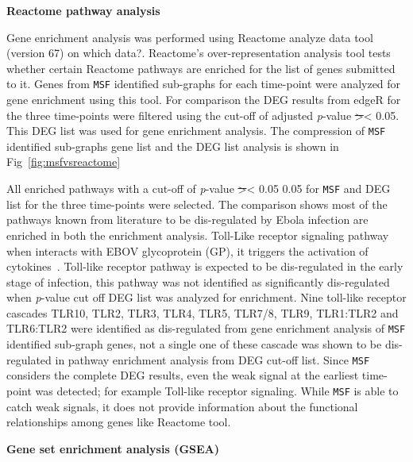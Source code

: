 \documentclass[10pt,a4paper,twocolumn]{article}
\newcommand{\FA}[1]{\begingroup\color{magenta}#1\endgroup}
\newcommand{\TODO}[1]{\begingroup\color{red}#1\endgroup}
\begin{document}
	\textbf{Reactome pathway analysis}
	
	Gene enrichment analysis was performed using Reactome analyze
        data tool~\cite{Reactome} (version 67) \TODO{on which
          data?}. Reactome's over-representation analysis tool tests
        whether certain Reactome pathways are enriched for the list of
        genes submitted to it. Genes from \texttt{MSF} identified
        sub-graphs for each time-point were analyzed for gene
        enrichment using this tool.  For comparison the DEG results
        from edgeR for the three time-points were filtered using the
        cut-off of adjusted \textit{p}-value \sout{>}\FA{<} 0.05. This
        DEG list was used for gene enrichment analysis. The
        compression of \texttt{MSF} identified sub-graphs gene list
        and the DEG list analysis is shown in
        Fig~\ref{fig:msfvsreactome}
	
	All enriched pathways with a cut-off of \textit{p}-value
        \sout{>}\FA{<} 0.05 0.05 for \texttt{MSF} and DEG list for the
        three time-points were selected. The comparison shows most of
        the pathways known from literature to be dis-regulated by
        Ebola infection are enriched in both the enrichment
        analysis. Toll-Like receptor signaling pathway when interacts
        with EBOV glycoprotein (GP), it triggers the activation of
        cytokines~\cite{Olejnik}. Toll-like receptor pathway is
        expected to be dis-regulated in the early stage of infection,
        this pathway was not identified as significantly dis-regulated
        when \textit{p}-value cut off DEG list was analyzed for
        enrichment. Nine toll-like receptor cascades TLR10, TLR2,
        TLR3, TLR4, TLR5, TLR7/8, TLR9, TLR1:TLR2 and TLR6:TLR2 were
        identified as dis-regulated from gene enrichment analysis of
        \texttt{MSF} identified sub-graph genes, not a single one of
        these cascade was shown to be dis-regulated in pathway
        enrichment analysis from DEG cut-off list. Since \texttt{MSF}
        considers the complete DEG results, even the weak signal at
        the earliest time-point was detected; for example Toll-like
        receptor signaling. While \texttt{MSF} is able to catch weak
        signals, it does not provide information about the functional
        relationships among genes like Reactome tool.
	
	\textbf{Gene set enrichment analysis (GSEA)}
	
\end{document}
